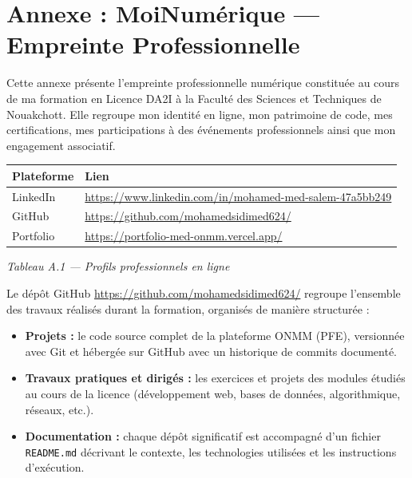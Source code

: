 ﻿\documentclass[12pt,a4paper]{report}
\begin{document}
\chapter*{Annexe : MoiNumérique --- Empreinte Professionnelle}
\thispagestyle{fancy}

Cette annexe présente l'empreinte professionnelle numérique constituée au cours de ma formation en
Licence DA2I à la Faculté des Sciences et Techniques de Nouakchott. Elle regroupe mon identité en ligne,
mon patrimoine de code, mes certifications, mes participations à des événements professionnels ainsi que
mon engagement associatif.

\medskip
{}
\medskip

\begin{center}
\begin{tabularx}{\textwidth}{|l|X|}
\hline
\textbf{Plateforme} & \textbf{Lien} \\
\hline
LinkedIn &
\url{https://www.linkedin.com/in/mohamed-med-salem-47a5bb249} \\
\hline
GitHub &
\url{https://github.com/mohamedsidimed624/} \\
\hline
Portfolio &
\url{https://portfolio-med-onmm.vercel.app/} \\
\hline
\end{tabularx}

\smallskip
{\small\textit{Tableau A.1 --- Profils professionnels en ligne}}
\end{center}

\medskip
{}
\medskip

Le dépôt GitHub \url{https://github.com/mohamedsidimed624/} regroupe l'ensemble des travaux
réalisés durant la formation, organisés de manière structurée :

\begin{itemize}
    \item \textbf{Projets :} le code source complet de la plateforme ONMM (PFE), versionnée avec Git
    et hébergée sur GitHub avec un historique de commits documenté.
    \item \textbf{Travaux pratiques et dirigés :} les exercices et projets des modules étudiés au cours
    de la licence (développement web, bases de données, algorithmique, réseaux, etc.).
    \item \textbf{Documentation :} chaque dépôt significatif est accompagné d'un fichier
    \texttt{README.md} décrivant le contexte, les technologies utilisées et les instructions d'exécution.
\end{itemize}
\end{document}
